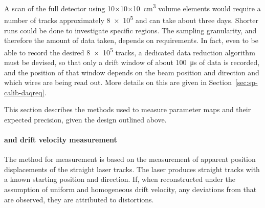 
A scan of the full detector using \num{10}$\times$\num{10}$\times$\SI{10}{\cubic\cm}
volume elements would require a number of tracks approximately \num{8e5} 
and can take about three days. Shorter runs could be done to investigate specific regions. The sampling granularity, and therefore the amount of data taken, depends on  requirements. In fact, even to be able to record the desired \num{8e5} tracks, a dedicated data reduction algorithm must be devised, so that only a drift window of about \SI{100}{\micro\s}
of data is recorded, and the position of that window depends on the beam position and direction and which wires are being read out. More details on this are given in Section~\ref{sec:sp-calib-daqreq}.






\label{sec:sp-calib-sys-las-ion-meas}

This section describes the methods used to measure 
parameter maps and their expected precision, given the design outlined above.

\paragraph{\efield and drift velocity measurement}
The method for \efield measurement is based on the measurement of apparent position displacements of the straight laser tracks. The laser produces straight tracks with a known starting position and direction. If, when reconstructed under the assumption of uniform and homogeneous drift velocity, any deviations from that are observed, they are attributed to \efield distortions. 

